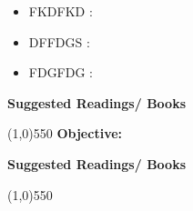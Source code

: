 \documentclass{article}
\begin{document}
\begin{itemize}
\item {\small{FKDFKD :} }
\end{itemize}


\begin{itemize}
\item {\small{DFFDGS :} }
\end{itemize}


\begin{itemize}
\item {\small{FDGFDG :} }
\end{itemize}


\begin{flushleft}
{\color{black}\bf{Suggested Readings/ Books}}
\end{flushleft}
\color{black}\line(1,0){550}
\clearpage
\clearpage
{} 
\linebreak\linebreak\linebreak
\large{\bf{Objective:}}
	
\begin{flushleft}
{\color{black}\bf{Suggested Readings/ Books}}
\end{flushleft}
\color{black}\line(1,0){550}
\clearpage
\clearpage
\end{document}

